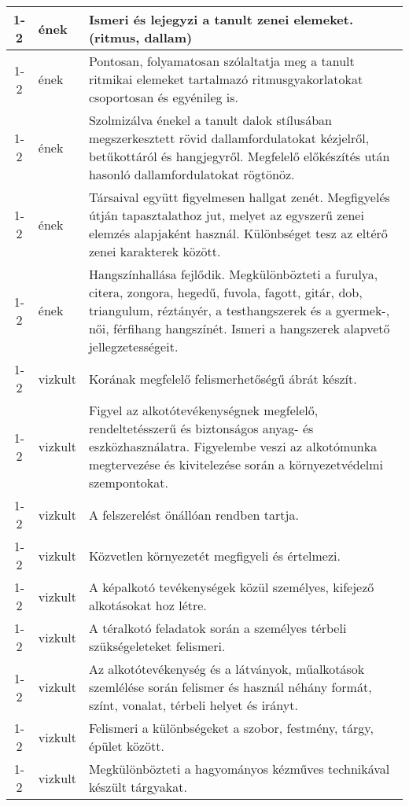 \begin{small}
\begin{longtable}{c | p{2cm} |  p{11cm} }
              1-2 & ének & Ismeri és lejegyzi a tanult zenei elemeket. (ritmus, dallam) \\ \hline
              1-2 & ének & Pontosan, folyamatosan szólaltatja meg a tanult ritmikai elemeket tartalmazó ritmusgyakorlatokat csoportosan és egyénileg is. \\ \hline
              1-2 & ének & Szolmizálva énekel a tanult dalok stílusában megszerkesztett rövid dallamfordulatokat kézjelről, betűkottáról és hangjegyről. Megfelelő előkészítés után hasonló dallamfordulatokat rögtönöz. \\ \hline
              1-2 & ének & Társaival együtt figyelmesen hallgat zenét. Megfigyelés útján tapasztalathoz jut, melyet az egyszerű zenei elemzés alapjaként használ. Különbséget tesz az eltérő zenei karakterek között. \\ \hline
              1-2 & ének & Hangszínhallása fejlődik. Megkülönbözteti a furulya, citera, zongora, hegedű, fuvola, fagott, gitár, dob, triangulum, réztányér, a testhangszerek és a gyermek-, női, férfihang hangszínét. Ismeri a hangszerek alapvető jellegzetességeit. \\ \hline
              1-2 & vizkult & Korának megfelelő felismerhetőségű ábrát készít. \\ \hline
              1-2 & vizkult & Figyel az alkotótevékenységnek megfelelő, rendeltetésszerű és biztonságos anyag- és eszközhasználatra. Figyelembe veszi az alkotómunka megtervezése és kivitelezése során a környezetvédelmi szempontokat. \\ \hline
              1-2 & vizkult & A felszerelést önállóan rendben tartja. \\ \hline
              1-2 & vizkult & Közvetlen környezetét megfigyeli és értelmezi. \\ \hline
              1-2 & vizkult & A képalkotó tevékenységek közül személyes, kifejező alkotásokat hoz létre. \\ \hline
              1-2 & vizkult & A téralkotó feladatok során a személyes térbeli szükségeleteket felismeri. \\ \hline
              1-2 & vizkult & Az alkotótevékenység és a látványok, műalkotások szemlélése során felismer és használ néhány formát, színt, vonalat, térbeli helyet és irányt. \\ \hline
              1-2 & vizkult & Felismeri a különbségeket a szobor, festmény, tárgy, épület között. \\ \hline
              1-2 & vizkult & Megkülönbözteti a hagyományos kézműves technikával készült tárgyakat. \\ \hline

\end{longtable}
\end{small}
